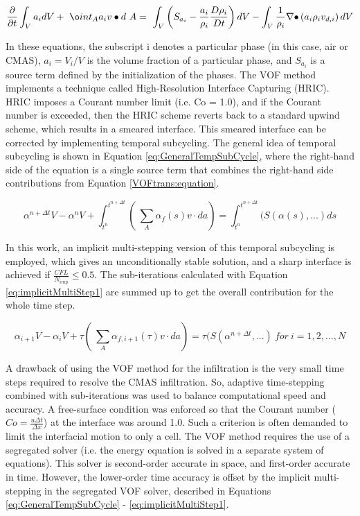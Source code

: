 \documentclass[conf]{new-aiaa}
\begin{document}
\begin{equation}
\label{VOFtrans:equation}
    \frac{\partial}{\partial t}\int_{V}{a_idV}+\ \o int_{A}{a_{i} v\bullet d\ A}=\ \int_{V}{\left(S_{a_i}-\frac{a_i}{\rho_i}\frac{D\rho_i}{Dt}\right)dV-\int_{V}{\frac{1}{\rho_i}\mathrm{\nabla}\bullet}}\left(a_i\rho_iv_{d,i}\right)dV
\end{equation}

\noindent In these equations, the subscript i denotes a particular phase (in this case, air or CMAS), $a_i = V_i/V$ is the volume fraction of a particular phase, and $S_{a_{i}}$ is a source term defined by the initialization of the phases. The VOF method implements a technique called High-Resolution Interface Capturing (HRIC). HRIC imposes a Courant number limit (i.e. Co = 1.0), and if the Courant number is exceeded, then the HRIC scheme reverts back to a standard upwind scheme, which results in a smeared interface. This smeared interface can be corrected by implementing temporal subcycling. The general idea of temporal subcycling is shown in Equation \ref{eq:GeneralTempSubCycle}, where the right-hand side of the equation is a single source term that combines the right-hand side contributions from Equation \ref{VOFtrans:equation}. 

\begin{equation}
\label{eq:GeneralTempSubCycle}
    \alpha^{n+\Delta t}V - \alpha^{n}V + \int_{t^{n}}^{t^{n+\Delta t}}( \ \sum_{A}\alpha_{f}(s) v \cdot da) = \int_{t^{n}}^{t^{n+\Delta t}}(S(\alpha (s),...)ds
\end{equation}

\noindent In this work, an implicit multi-stepping version of this temporal subcycling is employed, which gives an unconditionally stable solution, and a sharp interface is achieved if $\frac{CFL}{N_{imp}} \leqslant 0.5 $. The sub-iterations calculated with Equation \ref{eq:implicitMultiStep1} are summed up to get the overall contribution for the whole time step.

\begin{equation}
\label{eq:implicitMultiStep1}
    \alpha_{i+1}V - \alpha_{i}V + \tau( \ \sum_{A}\alpha_{f,i+1}(\tau) v \cdot da) = \tau(S(\alpha^{n+\Delta t},...) ~for~ i = 1, 2, ..., N
\end{equation}

A drawback of using the VOF method for the infiltration is the very small time steps required to resolve the CMAS infiltration. So, adaptive time-stepping combined with sub-iterations was used to balance computational speed and accuracy. A free-surface condition was enforced so that the Courant number ($Co = \frac{u \Delta t}{\Delta x}$) at the interface was around 1.0. Such a criterion is often demanded to limit the interfacial motion to only a cell. The VOF method requires the use of a segregated solver (i.e. the energy equation is solved in a separate system of equations). This solver is second-order accurate in space, and first-order accurate in time. However, the lower-order time accuracy is offset by the implicit multi-stepping in the segregated VOF solver, described in Equations \ref{eq:GeneralTempSubCycle} - \ref{eq:implicitMultiStep1}. 
\end{document}
